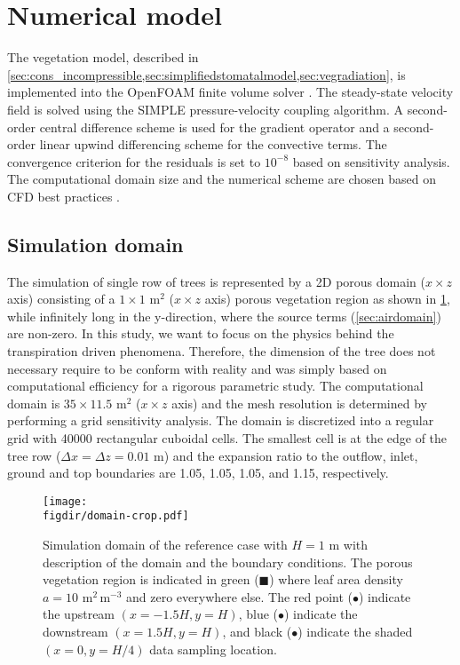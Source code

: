 \section{Numerical model}
\label{sec:nummodel}

The vegetation model, described in \cref{sec:cons_incompressible,sec:simplifiedstomatalmodel,sec:vegradiation}, is implemented into the OpenFOAM finite volume solver \citep{Weller1998a}. The steady-state velocity field is solved using the SIMPLE pressure-velocity coupling algorithm. A second-order central difference scheme is used for the gradient operator and a second-order linear upwind differencing scheme for the convective terms. The convergence criterion for the residuals is set to $10^{-8}$ based on sensitivity analysis. The computational domain size and the numerical scheme are chosen based on CFD best practices \citep{Blocken2015, Franke2007, Tominaga2008}.

\subsection{Simulation domain}
The simulation of single row of trees is represented by a 2D porous domain ($x\times z$ axis) consisting of a $1\times1$ m$^2$ ($x\times z$ axis) porous vegetation region as shown in \cref{fig:domain}, while infinitely long in the y-direction, where the source terms (\cref{sec:airdomain}) are non-zero. In this study, we want to focus on the physics behind the transpiration driven phenomena. Therefore, the dimension of the tree does not necessary require to be conform with reality and was simply based on computational efficiency for a rigorous parametric study. The computational domain is $35\times11.5$ m$^2$ ($x\times z$ axis) and the mesh resolution is determined by performing a grid sensitivity analysis. The domain is discretized into a regular grid with \num{40000} rectangular cuboidal cells. The smallest cell is at the edge of the tree row ($\Delta x = \Delta z = 0.01$ m) and the expansion ratio to the outflow, inlet, ground and top boundaries are 1.05, 1.05, 1.05, and 1.15, respectively. 

	\begin{figure}[h]
	\centering
	\texttt{[image: \\figdir/domain-crop.pdf]}
	\caption{Simulation domain of the reference case with $H=1$ m with description of the domain and the boundary conditions. The porous vegetation region is indicated in green ({\color{flatuidarkgreen}$\blacksquare$}) where leaf area density $a=10$ m$^2$\,m$^{-3}$ and zero everywhere else. The red point ({\color{flatuidarkred}$\bullet$}) indicate the upstream $(x=-1.5H,y=H)$, blue ({\color{flatuidarkblue}$\bullet$}) indicate the downstream $(x=1.5H,y=H)$, and black ($\bullet$) indicate the shaded $(x=0,y=H/4)$ data sampling location.}
	\label{fig:domain}
	\end{figure}

